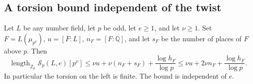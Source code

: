\subsection{A torsion bound independent of the twist}

\begin{lemma}\label{fcmp-torsion}
Let $L$ be any number field, let $p$ be odd, let $e\ge1$,
and let $\nu\ge1$. Set
$F=L(\mu_{p^\nu})$, $u=[F:L]$, $n_F=[F:\mathbb Q]$,
and let $s_F$ be the number of places of $F$ above $p$.
Then
\[
 \operatorname{length}_{\mathbb Z_p}\mathcal S_p(L,e)[p^\nu]
       \le \nu u+\nu(n_F+s_F)+\frac{\log h_F}{\log p}
       \le \nu u+2\nu n_F+\frac{\log h_F}{\log p}.
                                                               \tag{FC13}
\]
In particular the torsion on the left is finite. The
bound is independent of $e$.
\end{lemma}
